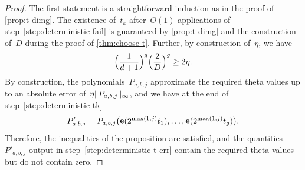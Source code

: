 \documentclass[12pt,oneside]{amsart}
\numberwithin{equation}{section}
\theoremstyle{definition}
\DeclareMathOperator{\e}{\mathbf{e}}
\DeclarePairedDelimiter{\paren}{(}{)}
\DeclarePairedDelimiter{\norm}{\|}{\|}
\begin{document}
\begin{proof}
  The first statement is a straightforward induction as in the proof of
  \cref{prop:t-dimg}. The existence of~$t_k$ after~$O(1)$ applications of
  step~\eqref{step:deterministic-fail} is guaranteed by \cref{prop:t-dimg} and
  the construction of~$D$ during the proof of \cref{thm:choose-t}. Further, by
  construction of~$\eta$, we have
  \begin{displaymath}
    \paren[\Big]{\frac{1}{d+1}}^g \paren[\Big]{\frac 2D}^g \geq 2\eta.
  \end{displaymath}
  By construction, the polynomials~$P_{a,b,j}$ approximate the required theta
  values up to an absolute error of~$\eta\norm{P_{a,b,j}}_\infty$, and we have
  at the end of step~\eqref{step:deterministic-tk}
  \begin{displaymath}
    P'_{a,b,j} = P_{a,b,j} \paren[\big]{\e(2^{\max(1,j)}t_1),\ldots, \e(2^{\max(1,j)}t_g)}.
  \end{displaymath}
  Therefore, the inequalities of the proposition are satisfied, and the
  quantities~$P'_{a,b,j}$ output in step~\eqref{step:deterministic-t-err}
  contain the required theta values but do not contain zero.
\end{proof}
\end{document}
